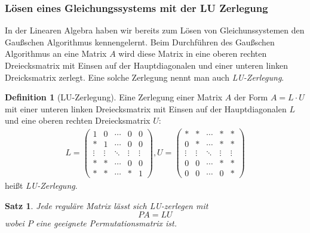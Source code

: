 \documentclass[smallheadings]{scrartcl}
\newtheorem{theorem}{Satz}
\theoremstyle{definition}
\newtheorem{definition}{Definition}[section]
\begin{document}
		\subsubsection{Lösen eines Gleichungssystems mit der LU Zerlegung}
	In der Linearen Algebra haben wir bereits zum Lösen von Gleichunssystemen den Gaußschen Algorithmus kennengelernt. Beim Durchführen des Gaußschen Algorithmus an eine Matrix $A$ wird diese Matrix in eine  oberen rechten Dreiecksmatrix mit Einsen auf der Hauptdiagonalen und einer unteren linken Dreicksmatrix zerlegt. Eine solche Zerlegung nennt man auch \textit{LU-Zerlegung}.
	\begin{definition}[LU-Zerlegung]
	Eine Zerlegung einer Matrix $A$ der Form $A=L\cdot U$ mit einer unteren linken Dreiecksmatrix mit Einsen auf der Hauptdiagonalen $L$ und eine oberen rechten Dreiecksmatrix $U$:
	\begin{align*}
	L=\begin{pmatrix}
	1&0&\cdots&0&0\\
	*&1&\cdots&0&0\\
	\vdots&\vdots&\ddots&\vdots&\vdots\\
	*&*&\cdots&0&0\\
	*&*&\cdots&*&1
	\end{pmatrix},
	U=\begin{pmatrix}
	*&*&\cdots&*&*\\
	0&*&\cdots&*&*\\
\vdots&\vdots&\ddots&\vdots&\vdots\\
	0&0&\cdots&*&*\\
	0&0&\cdots&0&*
	\end{pmatrix}
	\end{align*}
	heißt \textit{LU-Zerlegung}.
	\end{definition}
	\begin{theorem}
	Jede reguläre Matrix lässt sich LU-zerlegen mit 
	$$PA=LU$$
	wobei $P$ eine geeignete Permutationsmatrix ist. 
	\end{theorem}
\end{document}
